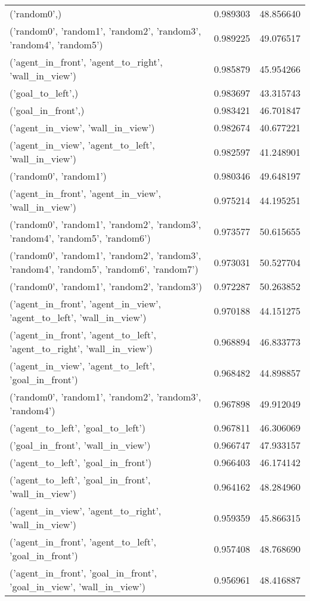 \begin{tabular}{lrr}
('random0',) & 0.989303 & 48.856640 \\
('random0', 'random1', 'random2', 'random3', 'random4', 'random5') & 0.989225 & 49.076517 \\
('agent\_in\_front', 'agent\_to\_right', 'wall\_in\_view') & 0.985879 & 45.954266 \\
('goal\_to\_left',) & 0.983697 & 43.315743 \\
('goal\_in\_front',) & 0.983421 & 46.701847 \\
('agent\_in\_view', 'wall\_in\_view') & 0.982674 & 40.677221 \\
('agent\_in\_view', 'agent\_to\_left', 'wall\_in\_view') & 0.982597 & 41.248901 \\
('random0', 'random1') & 0.980346 & 49.648197 \\
('agent\_in\_front', 'agent\_in\_view', 'wall\_in\_view') & 0.975214 & 44.195251 \\
('random0', 'random1', 'random2', 'random3', 'random4', 'random5', 'random6') & 0.973577 & 50.615655 \\
('random0', 'random1', 'random2', 'random3', 'random4', 'random5', 'random6', 'random7') & 0.973031 & 50.527704 \\
('random0', 'random1', 'random2', 'random3') & 0.972287 & 50.263852 \\
('agent\_in\_front', 'agent\_in\_view', 'agent\_to\_left', 'wall\_in\_view') & 0.970188 & 44.151275 \\
('agent\_in\_front', 'agent\_to\_left', 'agent\_to\_right', 'wall\_in\_view') & 0.968894 & 46.833773 \\
('agent\_in\_view', 'agent\_to\_left', 'goal\_in\_front') & 0.968482 & 44.898857 \\
('random0', 'random1', 'random2', 'random3', 'random4') & 0.967898 & 49.912049 \\
('agent\_to\_left', 'goal\_to\_left') & 0.967811 & 46.306069 \\
('goal\_in\_front', 'wall\_in\_view') & 0.966747 & 47.933157 \\
('agent\_to\_left', 'goal\_in\_front') & 0.966403 & 46.174142 \\
('agent\_to\_left', 'goal\_in\_front', 'wall\_in\_view') & 0.964162 & 48.284960 \\
('agent\_in\_view', 'agent\_to\_right', 'wall\_in\_view') & 0.959359 & 45.866315 \\
('agent\_in\_front', 'agent\_to\_left', 'goal\_in\_front') & 0.957408 & 48.768690 \\
('agent\_in\_front', 'goal\_in\_front', 'goal\_in\_view', 'wall\_in\_view') & 0.956961 & 48.416887 \\

\end{tabular}

